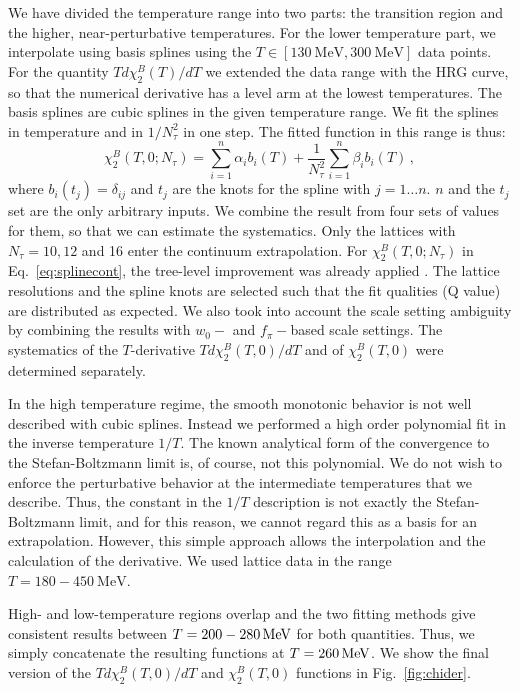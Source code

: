 \documentclass[aps,prd,twocolumn,superscriptaddress]{revtex4-2}
\newcommand{\MeV}{\, {\rm MeV}}
\begin{document}
We have divided the temperature range into two parts: the transition region and
the higher, near-perturbative temperatures. For the lower temperature part,
we interpolate using basis splines using the 
$T\in [130~\mathrm{MeV},300~\mathrm{MeV}]$ data points. For the quantity 
$T d\chi^B_2(T)/dT$ we extended the data range with the HRG curve, so that the
numerical derivative has a level arm at the lowest temperatures. 
The basis splines are cubic splines in
the given temperature range.  We fit the splines in temperature and in
$1/N_\tau^2$ in one step. The fitted function in this range is thus:
\begin{equation}
\chi^B_2(T,0;N_\tau) = \sum_{i=1}^n \alpha_i b_i(T) + 
\frac{1}{N_\tau^2}\sum_{i=1}^n \beta_i b_i(T) \,,
\label{eq:splinecont}
\end{equation}
where $b_i(t_j) = \delta_{ij}$ and $t_j$ are the knots for the spline with $j=1\dots n$.
$n$ and the $t_j$ set are the only arbitrary inputs. We combine the result from
four sets of values for them, so that we can estimate the systematics. Only the lattices with 
$N_\tau=10,12$ and 16 enter the continuum extrapolation. For 
$\chi^B_2(T,0;N_\tau)$ in Eq.~\eqref{eq:splinecont},
the tree-level improvement was already applied \cite{Bellwied:2015lba}.
The lattice resolutions and the spline knots are selected such that
the fit qualities (Q value) are distributed as expected.  We also took into
account the scale setting ambiguity by combining the results with $w_0-$ and 
$f_\pi-$based scale settings. The systematics of the $T$-derivative 
$T d \chi^B_2(T,0)/dT$ and of $\chi^B_2(T,0)$ were determined separately.

In the high temperature regime, the smooth monotonic behavior is not well
described with cubic splines. Instead we performed a high order polynomial fit
in the inverse temperature $1/T$. The known analytical form of the convergence
to the Stefan-Boltzmann limit is, of course, not this polynomial. We do not
wish to enforce the perturbative behavior at the intermediate temperatures that
we describe. Thus, the constant in the $1/T$ description is not exactly the
Stefan-Boltzmann limit, and for this reason, we cannot regard this as a basis
for an extrapolation. However, this simple approach allows the interpolation
and the calculation of the derivative. We used lattice data in the range
$T=180-450~\mathrm{MeV}$.

High- and low-temperature regions overlap and the two fitting methods
give consistent results between $T=200 - 280 \MeV$ for both quantities.
Thus, we simply concatenate the resulting functions at $T=260 \MeV$. 
We show the final version of the $T d\chi^B_2(T,0)/dT$ and
$\chi^B_2(T,0)$ functions in Fig.~\ref{fig:chider}.
\end{document}
